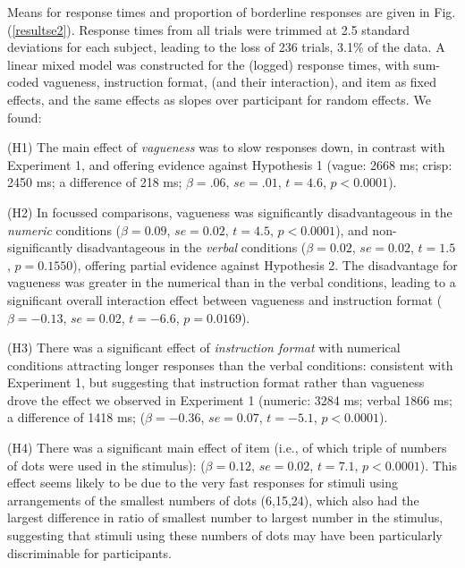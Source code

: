 \documentclass[%
man,		%
floatsintext,%
apacite%
]{apa6}
\begin{document}
Means for response times and proportion of borderline responses are given in Fig. (\ref{resultse2}). 
Response times from all trials were trimmed at 2.5 standard deviations for each subject, leading to the loss of 236 trials, 3.1\% of the data. 
A linear mixed model was constructed for the (logged) response times, 
with sum-coded vagueness, instruction format, (and their interaction), and item as fixed effects, and the same effects as slopes over participant for random effects. We found:
{\small
\begin{APAenumerate}
	\item [(H1)] The main effect of \emph{vagueness} was to slow responses down, in contrast with Experiment 1, and offering evidence against Hypothesis 1 (vague: 2668 ms; crisp: 2450 ms; a difference of 218 ms; $\beta=.06$, $se=.01$, $t=4.6$, $p<0.0001$). 
	\item [(H2)] In focussed comparisons, vagueness was significantly disadvantageous in the \emph{numeric} conditions ($\beta=0.09$, $se=0.02$, $t=4.5$, $p<0.0001$), and non-significantly disadvantageous in the \emph{verbal} conditions ($\beta=0.02$, $se=0.02$, $t=1.5$, $p=0.1550$), offering partial evidence against Hypothesis 2. The disadvantage for vagueness was greater in the numerical than in the verbal conditions, leading to a significant overall interaction effect between vagueness and instruction format ($\beta=-0.13$, $se=0.02$, $t=-6.6$, $p=0.0169$).
	\item [(H3)] There was a significant effect of \emph{instruction format} with numerical conditions attracting longer responses than the verbal conditions: consistent with Experiment 1, but suggesting that instruction format rather than vagueness drove the effect we observed in Experiment 1 (numeric: 3284 ms; verbal 1866 ms; a difference of 1418 ms; ($\beta=-0.36$, $se=0.07$, $t=-5.1$, $p<0.0001$).
	\item [(H4)] There was a significant main effect of item (i.e., of which triple of numbers of dots were used in the stimulus): ($\beta=0.12$, $se=0.02$, $t=7.1$, $p<0.0001$). This effect seems likely to be due to the very fast responses for stimuli using arrangements of the smallest numbers of dots (6,15,24), which also had the largest difference in ratio of smallest number to largest number in the stimulus, suggesting that stimuli using these numbers of dots may have been particularly discriminable for participants.
\end{APAenumerate}
}
\end{document}

